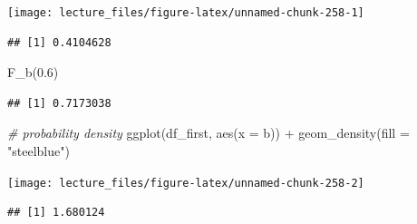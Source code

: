 \documentclass[
]{book}
\newenvironment{Shaded}{\begin{snugshade}}{\end{snugshade}}
\newcommand{\AttributeTok}[1]{\textcolor[rgb]{0.77,0.63,0.00}{#1}}
\newcommand{\CommentTok}[1]{\textcolor[rgb]{0.56,0.35,0.01}{\textit{#1}}}
\newcommand{\FloatTok}[1]{\textcolor[rgb]{0.00,0.00,0.81}{#1}}
\newcommand{\FunctionTok}[1]{\textcolor[rgb]{0.00,0.00,0.00}{#1}}
\newcommand{\NormalTok}[1]{#1}
\newcommand{\OtherTok}[1]{\textcolor[rgb]{0.56,0.35,0.01}{#1}}
\newcommand{\SpecialCharTok}[1]{\textcolor[rgb]{0.00,0.00,0.00}{#1}}
\newcommand{\StringTok}[1]{\textcolor[rgb]{0.31,0.60,0.02}{#1}}
\begin{document}
\begin{center}\texttt{[image: lecture\_files/figure-latex/unnamed-chunk-258-1]} \end{center}

\begin{Shaded}
\end{Shaded}

\begin{verbatim}
## [1] 0.4104628
\end{verbatim}

\begin{Shaded}
\begin{Highlighting}[]
\FunctionTok{F\_b}\NormalTok{(}\FloatTok{0.6}\NormalTok{)}
\end{Highlighting}
\end{Shaded}

\begin{verbatim}
## [1] 0.7173038
\end{verbatim}

\begin{Shaded}
\begin{Highlighting}[]
\CommentTok{\# probability density}
\FunctionTok{ggplot}\NormalTok{(df\_first, }\FunctionTok{aes}\NormalTok{(}\AttributeTok{x =}\NormalTok{ b)) }\SpecialCharTok{+} \FunctionTok{geom\_density}\NormalTok{(}\AttributeTok{fill =} \StringTok{"steelblue"}\NormalTok{)}
\end{Highlighting}
\end{Shaded}

\begin{center}\texttt{[image: lecture\_files/figure-latex/unnamed-chunk-258-2]} \end{center}

\begin{Shaded}
\end{Shaded}

\begin{verbatim}
## [1] 1.680124
\end{verbatim}
\end{document}

